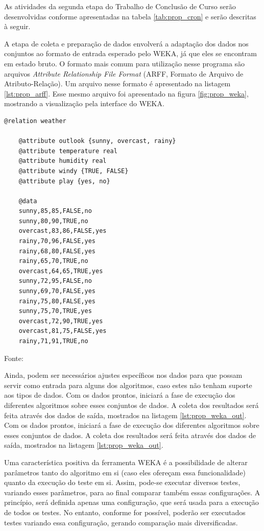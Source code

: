As atividades da segunda etapa do Trabalho de Conclusão de Curso serão desenvolvidas conforme apresentadas na tabela \ref{tab:prop_cron} e serão descritas à seguir.

A etapa de coleta e preparação de dados envolverá a adaptação dos dados nos conjuntos ao formato de entrada esperado pelo WEKA, já que eles se encontram em estado bruto. O formato mais comum para utilização nesse programa são arquivos \emph{Attribute Relationship File Format} (ARFF, Formato de Arquivo de Atributo-Relação). Um arquivo nesse formato é apresentado na listagem \ref{lst:prop_arff}. Esse mesmo arquivo foi apresentado na figura \ref{fig:prop_weka}, mostrando a visualização pela interface do WEKA.

\vspace{0.5cm}
\begin{lstlisting}[caption=Exemplo de arquivo no formato ARFF, label=lst:prop_arff]
    @relation weather

    @attribute outlook {sunny, overcast, rainy}
    @attribute temperature real
    @attribute humidity real
    @attribute windy {TRUE, FALSE}
    @attribute play {yes, no}

    @data
    sunny,85,85,FALSE,no
    sunny,80,90,TRUE,no
    overcast,83,86,FALSE,yes
    rainy,70,96,FALSE,yes
    rainy,68,80,FALSE,yes
    rainy,65,70,TRUE,no
    overcast,64,65,TRUE,yes
    sunny,72,95,FALSE,no
    sunny,69,70,FALSE,yes
    rainy,75,80,FALSE,yes
    sunny,75,70,TRUE,yes
    overcast,72,90,TRUE,yes
    overcast,81,75,FALSE,yes
    rainy,71,91,TRUE,no
\end{lstlisting}
\vspace{0.25cm}
\centerline{Fonte: \cite{Hall2009}}
\vspace{0.5cm}

Ainda, podem ser necessários ajustes específicos nos dados para que possam servir como entrada para alguns dos algoritmos, caso estes não tenham suporte aos tipos de dados. Com os dados prontos, iniciará a fase de execução dos diferentes algoritmos sobre esses conjuntos de dados. A coleta dos resultados será feita através dos dados de saída, mostrados na listagem \ref{lst:prop_weka_out}. Com os dados prontos, iniciará a fase de execução dos diferentes algoritmos sobre esses conjuntos de dados. A coleta dos resultados será feita através dos dados de saída, mostrados na listagem \ref{lst:prop_weka_out}.

Uma característica positiva da ferramenta WEKA é a possibilidade de alterar parâmetros tanto do algoritmo em si (caso eles ofereçam essa funcionalidade) quanto da execução do teste em si. Assim, pode-se executar diversos testes, variando esses parâmetros, para ao final comparar também essas configurações. A princípio, será definida apenas uma configuração, que será usada para a execução de todos os testes. No entanto, conforme for possível, poderão ser executados testes variando essa configuração, gerando comparação mais diversificadas.

